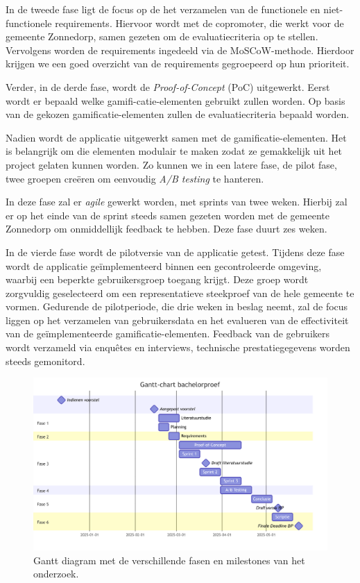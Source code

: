 \documentclass{hogent-article}
\begin{document}
In de tweede fase ligt de focus op de het verzamelen van de functionele en niet-functionele requirements. Hiervoor wordt met de copromoter, die werkt voor de gemeente Zonnedorp, samen gezeten om de evaluatiecriteria op te stellen. Vervolgens worden de requirements ingedeeld via de MoSCoW-methode. Hierdoor krijgen we een goed overzicht van de requirements gegroepeerd op hun prioriteit.

Verder, in de derde fase,  wordt de \emph{Proof-of-Concept} (PoC) uitgewerkt. Eerst wordt er bepaald welke gamifi-catie-elementen gebruikt zullen worden. Op basis van de gekozen gamificatie-elementen zullen de evaluatiecriteria bepaald worden.

Nadien wordt de applicatie uitgewerkt samen met de gamificatie-elementen. Het is belangrijk om die elementen modulair te maken zodat ze gemakkelijk uit het project gelaten kunnen worden. Zo kunnen we in een latere fase, de pilot fase, twee groepen creëren om eenvoudig \emph{A/B testing} te hanteren.

In deze fase zal er \emph{agile} gewerkt worden, met sprints van twee weken. Hierbij zal er op het einde van de sprint steeds samen gezeten worden met de gemeente Zonnedorp om onmiddellijk feedback te hebben. Deze fase duurt zes weken. 

In de vierde fase wordt de pilotversie van de applicatie getest. Tijdens deze fase wordt de applicatie geïmplementeerd binnen een gecontroleerde omgeving, waarbij een beperkte gebruikersgroep toegang krijgt. Deze groep wordt zorgvuldig geselecteerd om een representatieve steekproef van de hele gemeente te vormen. Gedurende de pilotperiode, die drie weken in beslag neemt, zal de focus liggen op het verzamelen van gebruikersdata en het evalueren van de effectiviteit van de geïmplementeerde gamificatie-elementen. Feedback van de gebruikers wordt verzameld via enquêtes en interviews, technische prestatiegegevens worden steeds gemonitord. 

\begin{figure}
    \centering
    \includegraphics[width=\textwidth]{chart.png}
    \caption{\label{fig:gantt}Gantt diagram met de verschillende fasen en milestones van het onderzoek.}
\end{figure}
\end{document}

